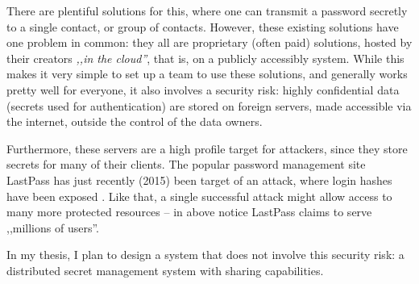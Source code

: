 There are plentiful solutions for this, where one can transmit a password secretly to a single contact, or group of contacts. However, these existing solutions have one problem in common: they all are proprietary (often paid) solutions, hosted by their creators \emph{,,in the cloud''}, that is, on a publicly accessibly system. While this makes it very simple to set up a team to use these solutions, and generally works pretty well for everyone, it also involves a security risk: highly confidential data (secrets used for authentication) are stored on foreign servers, made accessible via the internet, outside the control of the data owners.

Furthermore, these servers are a high profile target for attackers, since they store secrets for many of their clients.
The popular password management site LastPass has just recently (2015) been target of an attack, where login hashes have been exposed \cite{lastpass-security-notice}.
Like that, a single successful attack might allow access to many more protected resources -- in above notice LastPass claims to serve ,,millions of users''.

In my thesis, I plan to design a system that does not involve this security risk: a distributed secret management system with sharing capabilities.
